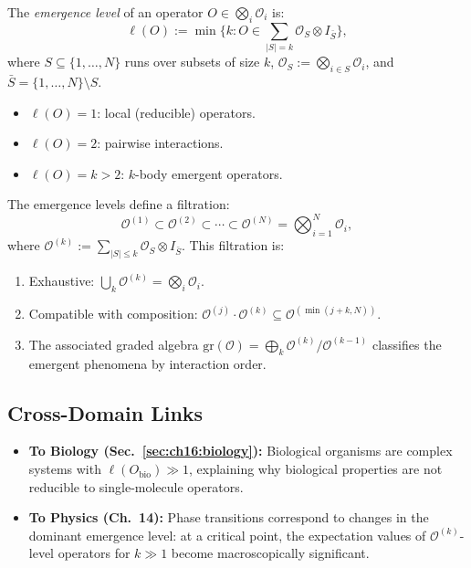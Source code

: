 \begin{definition}\label{def:18.3}
The \emph{emergence level} of an operator $O \in \bigotimes_i \mathcal{O}_i$
is:
\[
  \ell(O) := \min\bigl\{ k :
  O \in \textstyle\sum_{|S|=k} \mathcal{O}_S \otimes I_{\bar{S}} \bigr\},
\]
where $S \subseteq \{1, \ldots, N\}$ runs over subsets of size $k$,
$\mathcal{O}_S := \bigotimes_{i \in S} \mathcal{O}_i$, and
$\bar{S} = \{1,\ldots,N\} \setminus S$.
\begin{itemize}
  \item $\ell(O) = 1$: local (reducible) operators.
  \item $\ell(O) = 2$: pairwise interactions.
  \item $\ell(O) = k > 2$: $k$-body emergent operators.
\end{itemize}
\end{definition}

\begin{theorem}\label{thm:18.2}
The emergence levels define a filtration:
\[
  \mathcal{O}^{(1)} \subset \mathcal{O}^{(2)} \subset \cdots \subset
  \mathcal{O}^{(N)} = \bigotimes_{i=1}^N \mathcal{O}_i,
\]
where $\mathcal{O}^{(k)} := \sum_{|S| \leq k} \mathcal{O}_S \otimes
I_{\bar{S}}$.  This filtration is:
\begin{enumerate}
  \item[\textup{(i)}] Exhaustive: $\bigcup_k \mathcal{O}^{(k)} =
    \bigotimes_i \mathcal{O}_i$.
  \item[\textup{(ii)}] Compatible with composition:
    $\mathcal{O}^{(j)} \cdot \mathcal{O}^{(k)} \subseteq
    \mathcal{O}^{(\min(j+k, N))}$.
  \item[\textup{(iii)}] The associated graded algebra
    $\mathrm{gr}(\mathcal{O}) = \bigoplus_k \mathcal{O}^{(k)} /
    \mathcal{O}^{(k-1)}$ classifies the emergent phenomena by
    interaction order.
\end{enumerate}
\end{theorem}

\subsection{Cross-Domain Links}

\begin{itemize}
  \item \textbf{To Biology (Sec.~\ref{sec:ch16:biology}):}
        Biological organisms are complex systems with
        $\ell(O_{\mathrm{bio}}) \gg 1$, explaining why biological
        properties are not reducible to single-molecule operators.
  \item \textbf{To Physics (Ch.~14):} Phase transitions correspond
        to changes in the dominant emergence level: at a critical
        point, the expectation values of $\mathcal{O}^{(k)}$-level
        operators for $k \gg 1$ become macroscopically significant.
\end{itemize}

